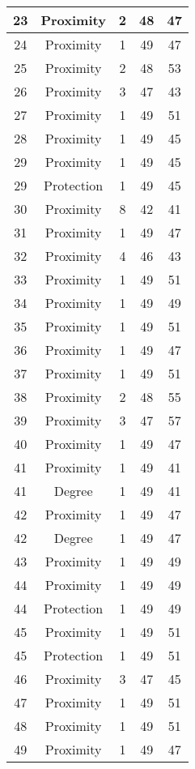 \documentclass[results.tex]{subfiles}
\begin{document}
\begin{center}
\begin{tabular}{| c || c | c | c | c |}
    \hline
    23 & Proximity & 2 & 48 & 47 \\ 
    \hline
    24 & Proximity & 1 & 49 & 47 \\ 
    \hline
    25 & Proximity & 2 & 48 & 53 \\ 
    \hline
    26 & Proximity & 3 & 47 & 43 \\ 
    \hline
    27 & Proximity & 1 & 49 & 51 \\ 
    \hline
    28 & Proximity & 1 & 49 & 45 \\ 
    \hline
    29 & Proximity & 1 & 49 & 45 \\ 
    \hline
    29 & Protection & 1 & 49 & 45 \\ 
    \hline
    30 & Proximity & 8 & 42 & 41 \\ 
    \hline
    31 & Proximity & 1 & 49 & 47 \\ 
    \hline
    32 & Proximity & 4 & 46 & 43 \\ 
    \hline
    33 & Proximity & 1 & 49 & 51 \\ 
    \hline
    34 & Proximity & 1 & 49 & 49 \\ 
    \hline
    35 & Proximity & 1 & 49 & 51 \\ 
    \hline
    36 & Proximity & 1 & 49 & 47 \\ 
    \hline
    37 & Proximity & 1 & 49 & 51 \\ 
    \hline
    38 & Proximity & 2 & 48 & 55 \\ 
    \hline
    39 & Proximity & 3 & 47 & 57 \\ 
    \hline
    40 & Proximity & 1 & 49 & 47 \\ 
    \hline
    41 & Proximity & 1 & 49 & 41 \\ 
    \hline
    41 & Degree & 1 & 49 & 41 \\ 
    \hline
    42 & Proximity & 1 & 49 & 47 \\ 
    \hline
    42 & Degree & 1 & 49 & 47 \\ 
    \hline
    43 & Proximity & 1 & 49 & 49 \\ 
    \hline
    44 & Proximity & 1 & 49 & 49 \\ 
    \hline
    44 & Protection & 1 & 49 & 49 \\ 
    \hline
    45 & Proximity & 1 & 49 & 51 \\ 
    \hline
    45 & Protection & 1 & 49 & 51 \\ 
    \hline
    46 & Proximity & 3 & 47 & 45 \\ 
    \hline
    47 & Proximity & 1 & 49 & 51 \\ 
    \hline
    48 & Proximity & 1 & 49 & 51 \\ 
    \hline
    49 & Proximity & 1 & 49 & 47 \\ 
    \hline   \end{tabular}
\end{center}
\end{document}
